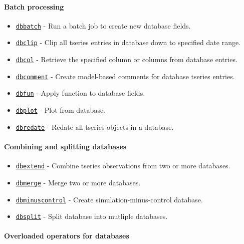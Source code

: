 \paragraph{Batch processing}

\begin{itemize}
\itemsep1pt\parskip0pt
\item
  \href{dbase/dbbatch}{\texttt{dbbatch}} - Run a batch job to create new
  database fields.
\item
  \href{dbase/dbclip}{\texttt{dbclip}} - Clip all tseries entries in
  database down to specified date range.
\item
  \href{dbase/dbcol}{\texttt{dbcol}} - Retrieve the specified column or
  columns from database entries.
\item
  \href{dbase/dbcomment}{\texttt{dbcomment}} - Create model-based
  comments for database tseries entries.
\item
  \href{dbase/dbfun}{\texttt{dbfun}} - Apply function to database
  fields.
\item
  \href{dbase/dbplot}{\texttt{dbplot}} - Plot from database.
\item
  \href{dbase/dbredate}{\texttt{dbredate}} - Redate all tseries objects
  in a database.
\end{itemize}

\paragraph{Combining and splitting
databases}

\begin{itemize}
\itemsep1pt\parskip0pt
\item
  \href{dbase/dbextend}{\texttt{dbextend}} - Combine tseries
  observations from two or more databases.
\item
  \href{dbase/dbmerge}{\texttt{dbmerge}} - Merge two or more databases.
\item
  \href{dbase/dbminuscontrol}{\texttt{dbminuscontrol}} - Create
  simulation-minus-control database.
\item
  \href{dbase/dbsplit}{\texttt{dbsplit}} - Split database into mutliple
  databases.
\end{itemize}

\paragraph{Overloaded operators for
databases}

